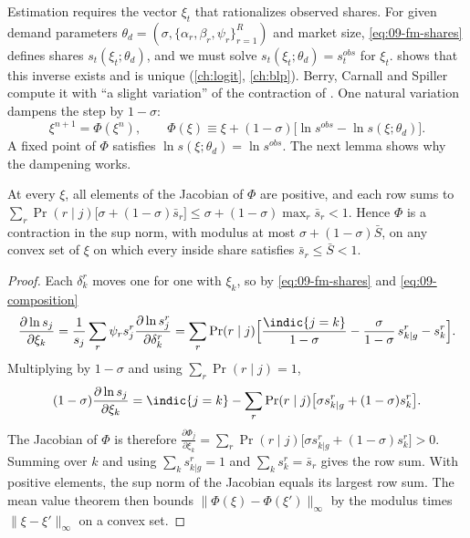 Estimation requires the vector $\xi_t$ that rationalizes observed shares. For given demand parameters
$\theta_d=(\sigma,\{\alpha_r,\beta_r,\psi_r\}_{r=1}^R)$ and market size, \eqref{eq:09-fm-shares}
defines shares $s_t(\xi_t;\theta_d)$, and we must solve $s_t(\xi_t;\theta_d)=s^{obs}_t$ for $\xi_t$.
\citet{Berry1994} shows that this inverse exists and is unique (\cref{ch:logit}, \cref{ch:blp}).
Berry, Carnall and Spiller compute it with ``a slight variation'' of the contraction of
\citet{BerryLevinsohnPakes1995} \citep[p.~17]{BerryCarnallSpiller2006}. One natural variation dampens
the step by $1-\sigma$:
\begin{equation}\label{eq:09-fm-contraction}
\xi^{n+1}=\Phi(\xi^n),\qquad \Phi(\xi)\equiv\xi+(1-\sigma)\big[\ln s^{obs}-\ln s(\xi;\theta_d)\big].
\end{equation}
A fixed point of $\Phi$ satisfies $\ln s(\xi;\theta_d)=\ln s^{obs}$. The next lemma shows why the
dampening works.

\begin{lemma}\label{lem:09-fm-contraction}
At every $\xi$, all elements of the Jacobian of $\Phi$ are positive, and each row sums to
$\sum_r\Pr(r\mid j)\big[\sigma+(1-\sigma)\bar s_r\big]\le\sigma+(1-\sigma)\max_r\bar s_r<1$. Hence
$\Phi$ is a contraction in the sup norm, with modulus at most $\sigma+(1-\sigma)\bar S$, on any convex
set of $\xi$ on which every inside share satisfies $\bar s_r\le\bar S<1$.
\end{lemma}

\begin{proof}
Each $\delta^r_k$ moves one for one with $\xi_k$, so by \eqref{eq:09-fm-shares} and
\eqref{eq:09-composition}
\begin{equation*}
\frac{\partial\ln s_j}{\partial\xi_k}=\frac{1}{s_j}\sum_r\psi_rs^r_j\frac{\partial\ln s^r_j}{\partial\delta^r_k}
=\sum_r\Pr(r\mid j)\Big[\frac{\indic\{j=k\}}{1-\sigma}-\frac{\sigma}{1-\sigma}\,s^r_{k|g}-s^r_k\Big].
\end{equation*}
Multiplying by $1-\sigma$ and using $\sum_r\Pr(r\mid j)=1$,
\begin{equation*}
(1-\sigma)\frac{\partial\ln s_j}{\partial\xi_k}
=\indic\{j=k\}-\sum_r\Pr(r\mid j)\big[\sigma s^r_{k|g}+(1-\sigma)s^r_k\big].
\end{equation*}
The Jacobian of $\Phi$ is therefore
$\frac{\partial\Phi_j}{\partial\xi_k}=\sum_r\Pr(r\mid j)\big[\sigma s^r_{k|g}+(1-\sigma)s^r_k\big]>0$.
Summing over $k$ and using $\sum_ks^r_{k|g}=1$ and $\sum_ks^r_k=\bar s_r$ gives the row sum. With
positive elements, the sup norm of the Jacobian equals its largest row sum. The mean value theorem then
bounds $\|\Phi(\xi)-\Phi(\xi')\|_\infty$ by the modulus times $\|\xi-\xi'\|_\infty$ on a convex set.
\end{proof}

